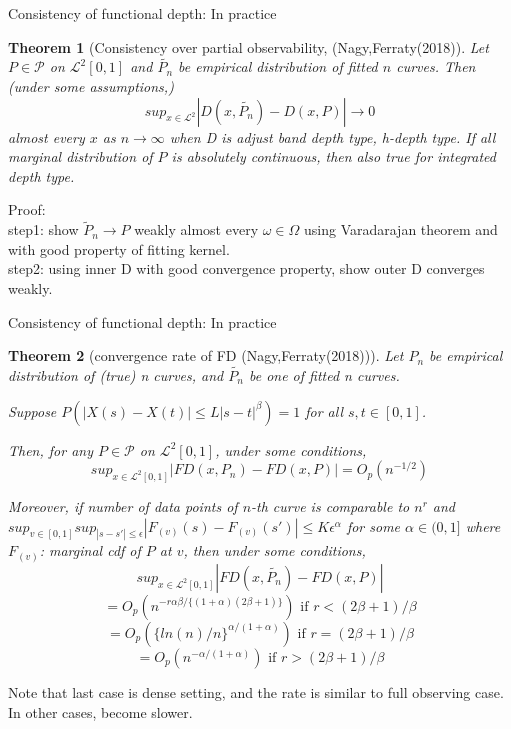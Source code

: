\documentclass[aspectratio=169,ignorenonframetext,9pt]{beamer}
\theoremstyle{plain}
\newtheorem{thm}{Theorem}[section]
\theoremstyle{definition}
\begin{document}
\begin{frame}{Consistency of functional depth: In practice}
    \begin{thm}[Consistency over partial observability, (Nagy,Ferraty(2018)]
        Let $P\in\mathcal{P}$ on $\mathcal{L}^2[0,1]$ and $\tilde{P_n}$ be empirical distribution of fitted $n$ curves.
        Then (under some assumptions,)
        \[sup_{x\in\mathcal{L}^2} |D(x,\tilde{P_n})-D(x,P)|\rightarrow 0\]
        almost every $x$ as $n\rightarrow\infty$ when D is adjust band depth type, h-depth type.
        If all marginal distribution of $P$ is absolutely continuous, then also true for integrated depth type.
    \end{thm}
    Proof:  \\
    step1: show $\tilde{P}_n\rightarrow P$ weakly almost every $\omega\in\Omega$ using Varadarajan theorem and with good property of fitting kernel. \\
    step2: using inner D with good convergence property, show outer D converges weakly.

\end{frame}

\begin{frame}{Consistency of functional depth: In practice}
    \begin{thm}[convergence rate of FD (Nagy,Ferraty(2018))]
        Let $P_n$ be empirical distribution of (true) n curves, and $\tilde{P_n}$ be one of fitted n curves.
        
        Suppose $P(|X(s)-X(t)|\leq L|s-t|^\beta)=1$ for all $s,t \in [0,1]$.

        Then, for any $P\in\mathcal{P}$ on $\mathcal{L}^2[0,1]$, under some conditions,
        \[sup_{x\in\mathcal{L}^2[0,1]}|FD(x,P_n)-FD(x,P)|=O_p(n^{-1/2})\]
        
        Moreover, if number of data points of $n$-th curve is comparable to $n^r$ and 
        \(sup_{v\in[0,1]} sup_{|s-s'|\leq \epsilon} |F_{(v)}(s)-F_{(v)}(s')|\leq K\epsilon^\alpha\) for some $\alpha\in(0,1]$
        where $F_{(v)}$: marginal cdf of $P$ at $v$,
        then under some conditions,
        \[sup_{x\in\mathcal{L}^2[0,1]}|FD(x,\tilde{P_n})-FD(x,P)|\]
        \[=O_p(n^{-r\alpha\beta/\{(1+\alpha)(2\beta+1)\}}) \text{ if } r<(2\beta+1)/\beta\]
        \[=O_p(\{ln(n)/n\}^{\alpha/(1+\alpha)}) \text{ if } r=(2\beta+1)/\beta\]
        \[=O_p(n^{-\alpha/(1+\alpha)}) \text{ if } r>(2\beta+1)/\beta\]
    \end{thm}
    Note that last case is dense setting, and the rate is similar to full observing case.
    In other cases, become slower.

\end{frame}
\end{document}

